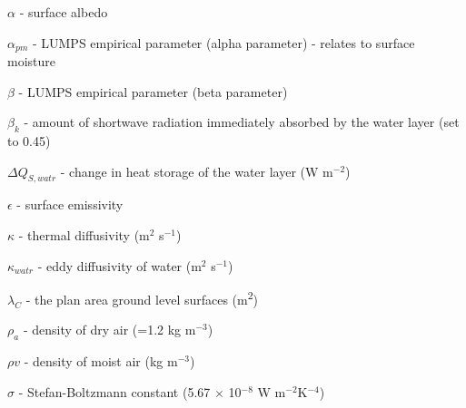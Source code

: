 {\begin{description}
\item \ensuremath{\alpha} - surface albedo
\item \ensuremath{\alpha_{pm}} - LUMPS empirical parameter (alpha parameter) - relates to surface moisture
\item \ensuremath{\beta} - LUMPS empirical parameter (beta parameter)
\item \ensuremath{\beta_{k}} - amount of shortwave radiation immediately absorbed by the water layer (set to 0.45)
\item \ensuremath{\Delta Q_{S,watr}} - change in heat storage of the water layer (W m$^{-2}$)
\item \ensuremath{\epsilon} - surface emissivity
\item \ensuremath{\kappa} - thermal diffusivity (m$^{2}$ s$^{-1}$)
\item \ensuremath{\kappa_{watr}} - eddy diffusivity of water (m$^{2}$ s$^{-1}$)
\item \ensuremath{\lambda_{C}} - the plan area ground level surfaces (m\textsuperscript{2})
\item \ensuremath{\rho_{a}} - density of dry air (=1.2 kg m$^{-3}$)
\item \ensuremath{\rho v} - density of moist air (kg m$^{-3}$)
\item \ensuremath{\sigma} - Stefan-Boltzmann constant (5.67 $\times$ 10$^{-8}$ W m$^{-2}$K$^{-4}$)















\end{description}
}
